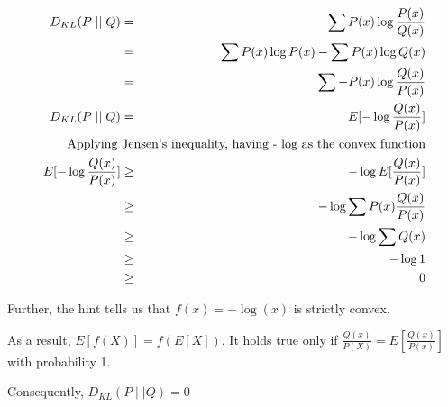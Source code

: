 
\begin{answer}

\begin{eqnarray*}
D_{KL} (P\mid\mid Q) &=& \sum P(x) \log \frac{P(x)}{Q(x)} \\
&=& \sum P(x) \log P(x) - \sum P(x) \log {Q(x)} \\
&=& \sum - P(x) \log \frac{Q(x)}{P(x)} \\
D_{KL} (P\mid\mid Q) &=& E[- \log \frac{Q(x)}{P(x)}] \\
&&\hspace*{-63pt}\text{Applying Jensen's inequality, having - log as the convex function} \\
E[- \log \frac{Q(x)}{P(x)}] &\geq& - \log E[\frac{Q(x)}{P(x)}] \\
&\geq& - \log \sum P(x) \frac{Q(x)}{P(x)}  \\
&\geq& - \log \sum Q(x)  \\
&\geq& - \log 1  \\
&\geq& 0 \\
\end{eqnarray*}

Further, the hint tells us that $f(x) = -\log(x)$ is strictly convex.

As a result, $E[f(X)] = f( E[X])$. It holds true only if $\frac{Q(x)}{P(X)} = E[\frac{Q(x)}{P(x)}]$ with probability 1. 

Consequently, $D_{KL}(P\mid\mid Q) = 0$




\end{answer}
